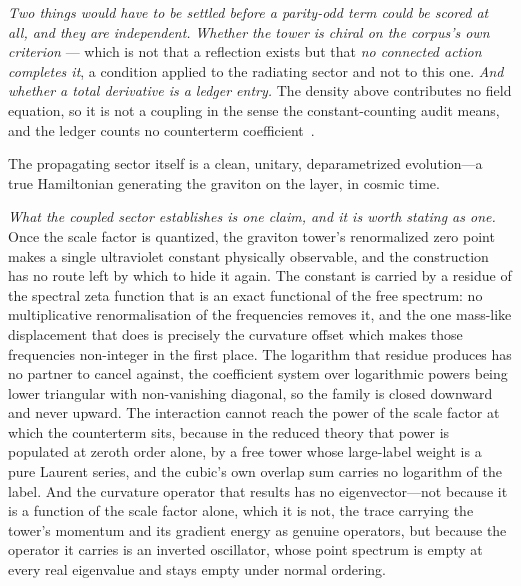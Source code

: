 \documentclass[11pt,a4paper]{article}
\theoremstyle{plain}
\theoremstyle{definition}
\theoremstyle{remark}
\begin{document}
\emph{Two things would have to be settled before a parity-odd term could be scored at all, and they are
independent.} \emph{Whether the tower is chiral on the corpus's own criterion} --- which is not that a
reflection exists but that \emph{no connected action completes it}, a condition applied to the radiating
sector and not to this one. \emph{And whether a total derivative is a ledger entry.} The density above
contributes no field equation, so it is not a coupling in the sense the constant-counting audit means, and
the ledger counts no counterterm coefficient~\cite{JanzenGeometricCore}. 

The propagating sector itself is a clean, unitary, deparametrized evolution---a true Hamiltonian generating the graviton on the layer, in cosmic time.

\emph{What the coupled sector establishes is one claim, and it is worth stating as one.} Once the scale factor
is quantized, the graviton tower's renormalized zero point makes a single ultraviolet constant physically
observable, and the construction has no route left by which to hide it again. The constant is carried by a
residue of the spectral zeta function that is an exact functional of the free spectrum: no multiplicative
renormalisation of the frequencies removes it, and the one mass-like displacement that does is precisely the
curvature offset which makes those frequencies non-integer in the first place. The logarithm that residue
produces has no partner to cancel against, the coefficient system over logarithmic powers being lower
triangular with non-vanishing diagonal, so the family is closed downward and never upward. The interaction
cannot reach the power of the scale factor at which the counterterm sits, because in the reduced theory that
power is populated at zeroth order alone, by a free tower whose large-label weight is a pure Laurent series,
and the cubic's own overlap sum carries no logarithm of the label. And the curvature operator that results has
no eigenvector---not because it is a function of the scale factor alone, which it is not, the trace carrying
the tower's momentum and its gradient energy as genuine operators, but because the operator it carries is an
inverted oscillator, whose point spectrum is empty at every real eigenvalue and stays empty under normal
ordering.
\end{document}
